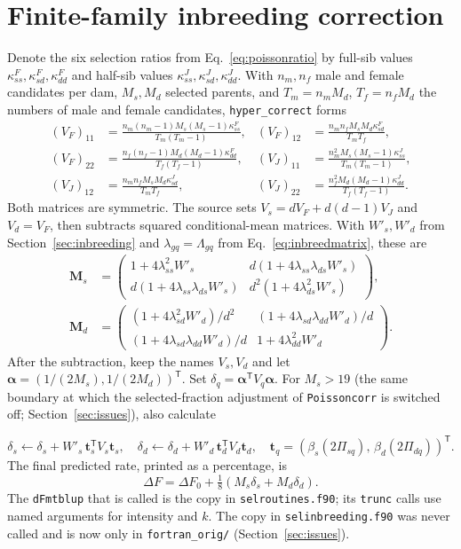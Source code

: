 \documentclass[11pt]{article}
\newcommand{\src}[1]{\texttt{#1}}
\newcommand{\ve}[1]{\boldsymbol{#1}}
\newcommand{\ma}[1]{\mathbf{#1}}
\begin{document}
\section{Finite-family inbreeding correction}\label{app:inbreeding}
Denote the six selection ratios from Eq.~\eqref{eq:poissonratio} by full-sib values $\kappa^F_{ss},\kappa^F_{sd},\kappa^F_{dd}$ and half-sib values $\kappa^J_{ss},\kappa^J_{sd},\kappa^J_{dd}$. With $n_m,n_f$ male and female candidates per dam, $M_s,M_d$ selected parents, and $T_m=n_mM_d$, $T_f=n_fM_d$ the numbers of male and female candidates, \src{hyper\_correct} forms
\begin{align}\label{eq:hyperbase}
(V_F)_{11}&=\frac{n_m(n_m-1)M_s(M_s-1)\kappa^F_{ss}}{T_m(T_m-1)},&
(V_F)_{12}&=\frac{n_mn_fM_sM_d \kappa^F_{sd}}{T_mT_f},\\
(V_F)_{22}&=\frac{n_f(n_f-1)M_d(M_d-1)\kappa^F_{dd}}{T_f(T_f-1)},&
(V_J)_{11}&=\frac{n_m^2M_s(M_s-1)\kappa^J_{ss}}{T_m(T_m-1)},\nonumber\\
(V_J)_{12}&=\frac{n_mn_fM_sM_d \kappa^J_{sd}}{T_mT_f},&
(V_J)_{22}&=\frac{n_f^2M_d(M_d-1)\kappa^J_{dd}}{T_f(T_f-1)}.\nonumber
\end{align}
Both matrices are symmetric. The source sets $V_s=dV_F+d(d-1)V_J$ and $V_d=V_F$, then subtracts squared conditional-mean matrices. With $W'_s,W'_d$ from Section~\ref{sec:inbreeding} and $\lambda_{gq}=\Lambda_{gq}$ from Eq.~\eqref{eq:inbreedmatrix}, these are
\begin{align}\label{eq:hypermean}
\ma M_s&=\begin{pmatrix}
1+4\lambda_{ss}^2W'_s&d(1+4\lambda_{ss}\lambda_{ds}W'_s)\\
d(1+4\lambda_{ss}\lambda_{ds}W'_s)&d^2(1+4\lambda_{ds}^2W'_s)
\end{pmatrix},\\
\ma M_d&=\begin{pmatrix}
(1+4\lambda_{sd}^2W'_d)/d^2&(1+4\lambda_{sd}\lambda_{dd}W'_d)/d\\
(1+4\lambda_{sd}\lambda_{dd}W'_d)/d&1+4\lambda_{dd}^2W'_d
\end{pmatrix}.\nonumber
\end{align}
After the subtraction, keep the names $V_s,V_d$ and let $\ve\alpha=(1/(2M_s),1/(2M_d))^{\mathsf T}$. Set $\delta_q=\ve\alpha^{\mathsf T}V_q\ve\alpha$. For $M_s>19$ (the same boundary at which the selected-fraction adjustment of \src{Poissoncorr} is switched off; Section~\ref{sec:issues}), also calculate

\begin{equation}\label{eq:hyperextra}
\delta_s\leftarrow\delta_s+W'_s\,\ve t_s^{\mathsf T}V_s\ve t_s,\quad
\delta_d\leftarrow\delta_d+W'_d\,\ve t_d^{\mathsf T}V_d\ve t_d,\quad
\ve t_q=(\beta_s(2\Pi_{sq}),\,\beta_d(2\Pi_{dq}))^{\mathsf T}.
\end{equation}
The final predicted rate, printed as a percentage, is
\begin{equation}\label{eq:hyperfinal}
\Delta F=\Delta F_0+\tfrac18(M_s\delta_s+M_d\delta_d).
\end{equation}
The \src{dFmtblup} that is called is the copy in \src{selroutines.f90}; its \src{trunc} calls use named arguments for intensity and $k$. The copy in \src{selinbreeding.f90} was never called and is now only in \src{fortran\_orig/} (Section~\ref{sec:issues}).
\end{document}

